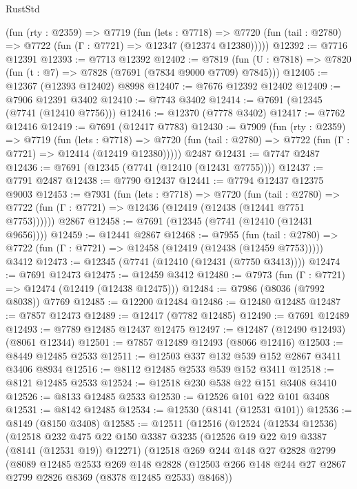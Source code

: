 \begin{lexlean}{RustStd}
\begin{coremodule}
    (fun (rty : @2359) =>
    @7719
      (fun (lets : @7718) =>
      @7720 (fun (tail : @2780) => @7722 (fun (Γ : @7721) => @12347 (@12374 @12380)))))
@12392 := @7716 @12391
@12393 := @7713 @12392
@12402 := @7819 (fun (U : @7818) => @7820 (fun (t : @7) => @7828 (@7691 (@7834 @9000 @7709) @7845)))
@12405 := @12367 (@12393 @12402) @8998
@12407 := @7676 @12392 @12402
@12409 := @7906 @12391 @3402
@12410 := @7743 @3402
@12414 := @7691 (@12345 (@7741 (@12410 @7756)))
@12416 := @12370 (@7778 @3402)
@12417 := @7762 @12416
@12419 := @7691 (@12417 @7783)
@12430 := @7909
    (fun (rty : @2359) =>
    @7719
      (fun (lets : @7718) =>
      @7720 (fun (tail : @2780) => @7722 (fun (Γ : @7721) => @12414 (@12419 @12380)))))
    @2487
@12431 := @7747 @2487
@12436 := @7691 (@12345 (@7741 (@12410 (@12431 @7755))))
@12437 := @7791 @2487
@12438 := @7790 @12437
@12441 := @7794 @12437 @12375 @9003
@12453 := @7931
    (fun (lets : @7718) =>
    @7720
      (fun (tail : @2780) =>
      @7722 (fun (Γ : @7721) => @12436 (@12419 (@12438 (@12441 @7751 @7753))))))
    @2867
@12458 := @7691 (@12345 (@7741 (@12410 (@12431 @9656))))
@12459 := @12441 @2867
@12468 := @7955
    (fun (tail : @2780) => @7722 (fun (Γ : @7721) => @12458 (@12419 (@12438 (@12459 @7753)))))
    @3412
@12473 := @12345 (@7741 (@12410 (@12431 (@7750 @3413))))
@12474 := @7691 @12473
@12475 := @12459 @3412
@12480 := @7973 (fun (Γ : @7721) => @12474 (@12419 (@12438 @12475)))
@12484 := @7986 (@8036 (@7992 @8038)) @7769
@12485 := @12200 @12484
@12486 := @12480 @12485
@12487 := @7857 @12473
@12489 := @12417 (@7782 @12485)
@12490 := @7691 @12489
@12493 := @7789 @12485 @12437 @12475
@12497 := @12487 (@12490 @12493) (@8061 @12344)
@12501 := @7857 @12489 @12493 (@8066 @12416)
@12503 := @8449 @12485 @2533
@12511 := @12503 @337 @132 @539 @152 @2867 @3411 @3406 @8934
@12516 := @8112 @12485 @2533 @539 @152 @3411
@12518 := @8121 @12485 @2533
@12524 := @12518 @230 @538 @22 @151 @3408 @3410
@12526 := @8133 @12485 @2533
@12530 := @12526 @101 @22 @101 @3408
@12531 := @8142 @12485
@12534 := @12530 (@8141 (@12531 @101))
@12536 := @8149 (@8150 @3408)
@12585 := @12511
    (@12516
      (@12524
        (@12534 @12536)
        (@12518
          @232
          @475
          @22
          @150
          @3387
          @3235
          (@12526 @19 @22 @19 @3387 (@8141 (@12531 @19)) @12271)
          (@12518
            @269
            @244
            @148
            @27
            @2828
            @2799
            (@8089
              @12485
              @2533
              @269
              @148
              @2828
              (@12503 @266 @148 @244 @27 @2867 @2799 @2826 @8369 (@8378 @12485 @2533) @8468))

\end{coremodule}
\end{lexlean}

